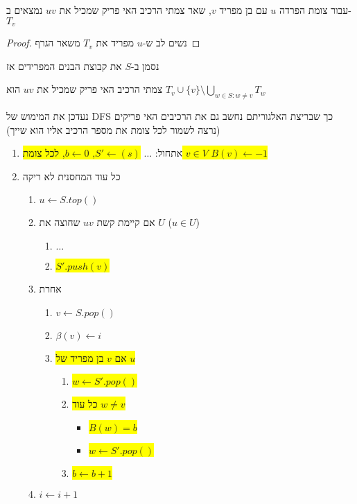 \begin{claim}
עבור צומת הפרדה $u$ עם בן מפריד $v$, שאר צמתי הרכיב האי פריק שמכיל את $uv$ נמצאים ב-%
$T_v$
\end{claim}
\begin{proof}
נשים לב ש-$u$ מפריד את 
$T_v$
משאר הגרף
\end{proof}
נסמן ב-$S$ את קבוצת הבנים המפרידים אז
\begin{corollary}
צמתי הרכיב האי פריק שמכיל את $uv$ הוא 
$T_v \cup \{v\} \setminus \bigcup_{w \in S:w \ne v} T_w$
\end{corollary}


נעדכן את המימוש של DFS כך שבריצת האלגוריתם נחשב גם את הרכיבים האי פריקים 
(נרצה לשמור לכל צומת את מספר הרכיב אליו הוא שייך)
\begin{enumerate}
\item
אתחול:
$\ldots$
\colorbox{yellow}{
$S' \leftarrow (s)$,
$b \leftarrow 0$,
לכל צומת 
$v \in V$
$B(v) \leftarrow -1$
}
\item
כל עוד המחסנית לא ריקה
\begin{enumerate}
	\item
	$u \leftarrow S.top()$
	\item 
	אם קיימת קשת 
	$uv$
	שחוצה את $U$ 
	($u \in U$)
		\begin{enumerate}
		\item $\ldots$
		\item
		\colorbox{yellow}{$S'.push(v)$}
		\end{enumerate}
	\item
	אחרת 
	\begin{enumerate}
		\item $v \leftarrow S.pop()$
		\item $\beta(v) \leftarrow i$

		\item 
				\colorbox{yellow}{
אם $v$ בן מפריד של $u$
		}
			\begin{enumerate}
				\item \colorbox{yellow}{$w \leftarrow S'.pop()$}
				\item \colorbox{yellow}{
כל עוד 
				$w \ne v$
				}
					\begin{itemize}
						\item \colorbox{yellow}{$B(w) = b$}
						\item \colorbox{yellow}{$w \leftarrow S'.pop()$}
					\end{itemize}	
			\item \colorbox{yellow}{$b \leftarrow b + 1$}
			\end{enumerate}			
	\end{enumerate}
	\item
	$i \leftarrow i + 1$
	\end{enumerate}
\end{enumerate}

